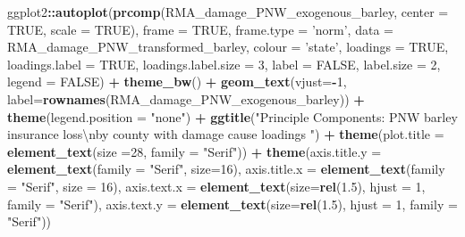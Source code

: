 \documentclass[]{article}
\newenvironment{Shaded}{\begin{snugshade}}{\end{snugshade}}
\newcommand{\CharTok}[1]{\textcolor[rgb]{0.31,0.60,0.02}{#1}}
\newcommand{\DataTypeTok}[1]{\textcolor[rgb]{0.13,0.29,0.53}{#1}}
\newcommand{\DecValTok}[1]{\textcolor[rgb]{0.00,0.00,0.81}{#1}}
\newcommand{\FloatTok}[1]{\textcolor[rgb]{0.00,0.00,0.81}{#1}}
\newcommand{\KeywordTok}[1]{\textcolor[rgb]{0.13,0.29,0.53}{\textbf{#1}}}
\newcommand{\NormalTok}[1]{#1}
\newcommand{\OperatorTok}[1]{\textcolor[rgb]{0.81,0.36,0.00}{\textbf{#1}}}
\newcommand{\OtherTok}[1]{\textcolor[rgb]{0.56,0.35,0.01}{#1}}
\newcommand{\StringTok}[1]{\textcolor[rgb]{0.31,0.60,0.02}{#1}}
\begin{document}
\begin{Shaded}
\begin{Highlighting}[]
\NormalTok{ggplot2}\OperatorTok{::}\KeywordTok{autoplot}\NormalTok{(}\KeywordTok{prcomp}\NormalTok{(RMA_damage_PNW_exogenous_barley, }\DataTypeTok{center =} \OtherTok{TRUE}\NormalTok{, }\DataTypeTok{scale =} \OtherTok{TRUE}\NormalTok{), }\DataTypeTok{frame =} \OtherTok{TRUE}\NormalTok{, }\DataTypeTok{frame.type =} \StringTok{'norm'}\NormalTok{, }\DataTypeTok{data =}\NormalTok{ RMA_damage_PNW_transformed_barley, }\DataTypeTok{colour =} \StringTok{'state'}\NormalTok{, }\DataTypeTok{loadings =} \OtherTok{TRUE}\NormalTok{, }\DataTypeTok{loadings.label =} \OtherTok{TRUE}\NormalTok{, }\DataTypeTok{loadings.label.size  =} \DecValTok{3}\NormalTok{, }\DataTypeTok{label =} \OtherTok{FALSE}\NormalTok{, }\DataTypeTok{label.size =} \DecValTok{2}\NormalTok{, }\DataTypeTok{legend =} \OtherTok{FALSE}\NormalTok{)  }\OperatorTok{+}\StringTok{ }\KeywordTok{theme_bw}\NormalTok{()   }\OperatorTok{+}\StringTok{ }\KeywordTok{geom_text}\NormalTok{(}\DataTypeTok{vjust=}\OperatorTok{-}\DecValTok{1}\NormalTok{, }\DataTypeTok{label=}\KeywordTok{rownames}\NormalTok{(RMA_damage_PNW_exogenous_barley)) }\OperatorTok{+}\StringTok{ }\KeywordTok{theme}\NormalTok{(}\DataTypeTok{legend.position =} \StringTok{"none"}\NormalTok{) }\OperatorTok{+}\StringTok{ }\KeywordTok{ggtitle}\NormalTok{(}\StringTok{"Principle Components: PNW barley insurance loss}\CharTok{\textbackslash{}n}\StringTok{by county with damage cause loadings "}\NormalTok{) }\OperatorTok{+}\StringTok{ }\KeywordTok{theme}\NormalTok{(}\DataTypeTok{plot.title =} \KeywordTok{element_text}\NormalTok{(}\DataTypeTok{size =}\DecValTok{28}\NormalTok{, }\DataTypeTok{family =} \StringTok{"Serif"}\NormalTok{)) }\OperatorTok{+}\StringTok{ }\KeywordTok{theme}\NormalTok{(}\DataTypeTok{axis.title.y =} \KeywordTok{element_text}\NormalTok{(}\DataTypeTok{family =} \StringTok{"Serif"}\NormalTok{, }\DataTypeTok{size=}\DecValTok{16}\NormalTok{), }\DataTypeTok{axis.title.x =} \KeywordTok{element_text}\NormalTok{(}\DataTypeTok{family =} \StringTok{"Serif"}\NormalTok{, }\DataTypeTok{size =} \DecValTok{16}\NormalTok{), }\DataTypeTok{axis.text.x =} \KeywordTok{element_text}\NormalTok{(}\DataTypeTok{size=}\KeywordTok{rel}\NormalTok{(}\FloatTok{1.5}\NormalTok{), }\DataTypeTok{hjust =} \DecValTok{1}\NormalTok{, }\DataTypeTok{family =} \StringTok{"Serif"}\NormalTok{), }\DataTypeTok{axis.text.y =} \KeywordTok{element_text}\NormalTok{(}\DataTypeTok{size=}\KeywordTok{rel}\NormalTok{(}\FloatTok{1.5}\NormalTok{), }\DataTypeTok{hjust =} \DecValTok{1}\NormalTok{, }\DataTypeTok{family =} \StringTok{"Serif"}\NormalTok{))}
\end{Highlighting}
\end{Shaded}
\end{document}
